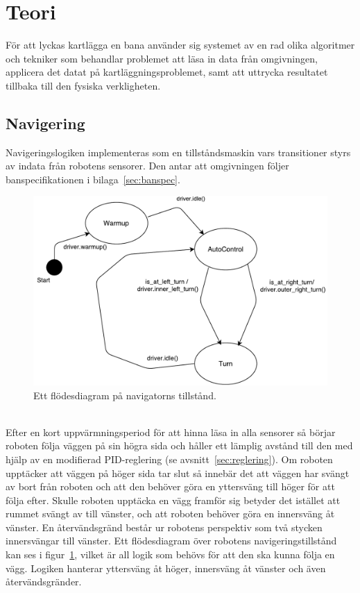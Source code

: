 \documentclass{article}
\begin{document}
\clearpage
\section{Teori}
För att lyckas kartlägga en bana använder sig systemet av en rad olika algoritmer och tekniker som behandlar problemet att läsa in data från omgivningen, applicera det datat på kartläggningsproblemet, samt att uttrycka resultatet tillbaka till den fysiska verkligheten.

\subsection{Navigering}
\label{sec:navigering}
Navigeringslogiken implementeras som en tillståndsmaskin vars transitioner styrs av indata från robotens sensorer. Den antar att omgivningen följer banspecifikationen i bilaga~\ref{sec:banspec}.

\begin{figure}[H]
\centering
\includegraphics[scale=0.4]{navigator_flowchart}
\caption{Ett flödesdiagram på navigatorns tillstånd.}
\label{fig:navigator_flowchart}
\end{figure}
\ \\
Efter en kort uppvärmningsperiod för att hinna läsa in alla sensorer så börjar roboten följa väggen på sin högra sida och håller ett lämplig avstånd till den med hjälp av en modifierad PID-reglering (se avsnitt~\ref{sec:reglering}). Om roboten upptäcker att väggen på höger sida tar slut så innebär det att väggen har svängt av bort från roboten och att den behöver göra en yttersväng till höger för att följa efter. Skulle roboten upptäcka en vägg framför sig betyder det istället att rummet svängt av till vänster, och att roboten behöver göra en innersväng åt vänster. En återvändsgränd består ur robotens perspektiv som två stycken innersvängar till vänster. Ett flödesdiagram över robotens navigeringstillstånd kan ses i figur~\ref{fig:navigator_flowchart}, vilket är all logik som behövs för att den ska kunna följa en vägg. Logiken hanterar yttersväng åt höger, innersväng åt vänster och även återvändsgränder.
\end{document}
